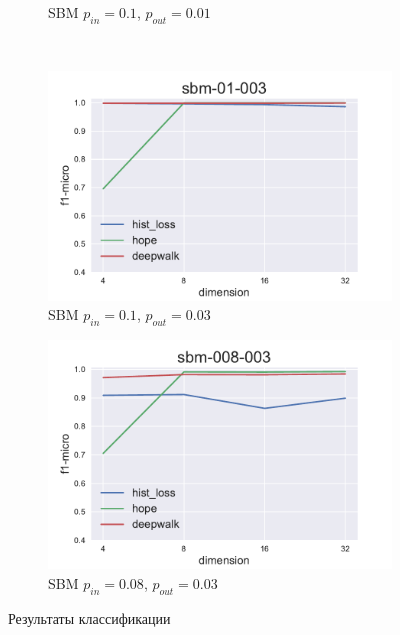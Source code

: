 \documentclass[12pt,a4paper]{extarticle}
\begin{document}
\begin{figure}
\begin{subfigure}{.5\linewidth}
    \caption{SBM $p_{in}=0.1$, $p_{out}=0.01$}
    \label{fig:clas_sbm1}
    \end{subfigure}
    \\[1ex]
    \begin{subfigure}{.5\linewidth}
    \centering
    \includegraphics[width=\linewidth]{src/images/Node_classification_sbm-01-003.pdf}
    \caption{SBM $p_{in}=0.1$, $p_{out}=0.03$}
    \label{fig:clas_sbm2}
    \end{subfigure}
    \begin{subfigure}{.5\linewidth}
    \centering
    \includegraphics[width=\linewidth]{src/images/Node_classification_sbm-008-003.pdf}
    \caption{SBM $p_{in}=0.08$, $p_{out}=0.03$}
    \label{fig:clas_sbm3}
    \end{subfigure}
    \caption{Результаты классификации}
    \label{fig:clas}
    \end{figure}
    
\end{document}
